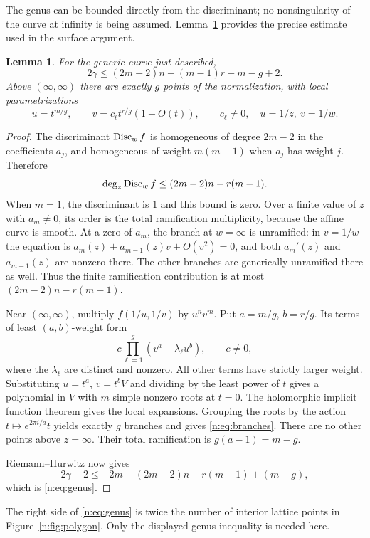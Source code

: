 \documentclass[UTF8,11pt]{ctexart}
\newtheorem{lem}[thm]{Lemma}
\theoremstyle{definition}
\numberwithin{equation}{section}
\begin{document}
The genus can be bounded directly from the discriminant; no nonsingularity
of the curve at infinity is being assumed. Lemma~\ref{n:lem:genus} provides the
precise estimate used in the surface argument.
\begin{lem}\label{n:lem:genus}
For the generic curve just described,
\begin{equation}\label{n:eq:genus}
 2\gamma\le(2m-2)n-(m-1)r-m-g+2.
\end{equation}
Above $(\infty,\infty)$ there are exactly $g$ points of the normalization,
with local parametrizations
\begin{equation}\label{n:eq:branches}
 u=t^{m/g},\qquad v=c_\ell t^{r/g}(1+O(t)),\qquad c_\ell\ne0,
 \quad u=1/z,\ v=1/w.
\end{equation}
\end{lem}
\begin{proof}
The discriminant $\operatorname{Disc}_w f$ is homogeneous of degree $2m-2$ in the
coefficients $a_j$, and homogeneous of weight $m(m-1)$ when $a_j$ has
weight $j$. Therefore
\[
 \deg_z\operatorname{Disc}_w f\le (2m-2)n-r(m-1).
\]
When $m=1$, the discriminant is $1$ and this bound is zero.
Over a finite value of $z$ with $a_m\ne0$, its order is the total
ramification multiplicity, because the affine curve is smooth. At a zero
of $a_m$, the branch at $w=\infty$ is unramified: in $v=1/w$ the equation
is $a_m(z)+a_{m-1}(z)v+O(v^2)=0$, and both $a_m'(z)$ and $a_{m-1}(z)$
are nonzero there. The other branches are generically unramified there
as well. Thus the finite ramification contribution is at most
$(2m-2)n-r(m-1)$.

Near $(\infty,\infty)$, multiply $f(1/u,1/v)$ by $u^nv^m$.
Put $a=m/g$, $b=r/g$. Its terms of least $(a,b)$-weight form
\[
 c\prod_{\ell=1}^g(v^a-\lambda_\ell u^b),
 \qquad c\ne0,
\]
where the $\lambda_\ell$ are distinct and nonzero. All other terms have
strictly larger weight. Substituting $u=t^a$, $v=t^bV$ and dividing by the
least power of $t$ gives a polynomial in $V$ with $m$ simple nonzero roots
at $t=0$. The holomorphic implicit function theorem gives the local
expansions. Grouping the roots by the action $t\mapsto e^{2\pi i/a}t$
yields exactly $g$ branches and gives \eqref{n:eq:branches}.
There are no other points above $z=\infty$. Their total ramification is
$g(a-1)=m-g$.

Riemann--Hurwitz now gives
\[
 2\gamma-2\le-2m+(2m-2)n-r(m-1)+(m-g),
\]
which is \eqref{n:eq:genus}.
\end{proof}

The right side of \eqref{n:eq:genus} is twice the number of interior lattice
points in Figure~\ref{n:fig:polygon}. Only the displayed genus inequality is needed here.
\end{document}
